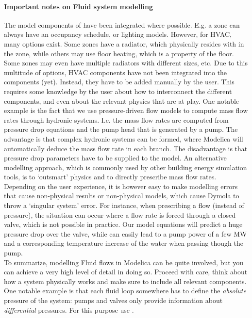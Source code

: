 \documentclass[10pt,a4paper]{article}
\begin{document}
\paragraph{Important notes on Fluid system modelling}
The model components of  have been integrated where possible.
E.g. a zone can always have an occupancy schedule, or lighting models. 
However, for HVAC, many options exist. Some zones have a radiator, which physically resides with in the zone, while others may use floor heating, which is a property of the floor.
Some zones may even have multiple radiators with different sizes, etc.
Due to this multitude of options, HVAC components have not been integrated into
the  components (yet).
Instead, they have to be added manually by the user.
This requires some knowledge by the user about how to interconnect the different components, 
and even about the relevant physics that are at play.
One notable example is the fact that we use pressure-driven flow models 
to compute mass flow rates through hydronic systems. 
I.e. the mass flow rates are computed from pressure drop equations
and the pump head that is generated by a pump.
The advantage is that complex hydronic systems can be formed, 
where Modelica will automatically deduce the mass flow rate in each branch.
The disadvantage is that pressure drop parameters have to be supplied
to the model.
An alternative modelling approach, which is commonly used by other building energy simulation tools, 
is to `outsmart' physics and to directly prescribe mass flow rates.
Depending on the user experience, it is however easy to make modelling errors that cause
non-physical results or non-physical models, which cause Dymola to throw a `singular system' error.
For instance, when prescribing a flow (instead of pressure),
the situation can occur where a flow rate is forced
through a closed valve, which is not possible in practice. 
Our model equations will predict a huge
pressure drop over the valve, while can easily lead to a pump power 
of a few MW and a corresponding
temperature increase of the water when passing though the pump.\\

To summarize, modelling Fluid flows in Modelica can be quite involved,
but you can achieve a very high level of detail in doing so.
Proceed with care, think about how a system physically works and make sure to 
include all relevant components.
One notable example is that each fluid loop somewhere has to define the 
\textit{absolute} pressure of the system: pumps and valves only provide information
about \textit{differential} pressures. 
For this purpose use .
\end{document}
